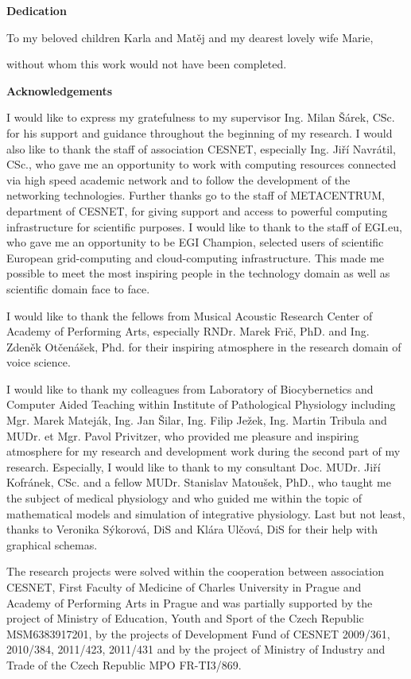 
\newpage
{}

\begin{center}
\Large \textbf{Dedication}
\end{center} 
\vfill
\begin{center}
To my beloved children Karla and Matěj and my dearest lovely wife Marie,

without whom this work would not have been completed.
\end{center} 
\vfill
\newpage
\mbox{}
\newpage
\pagestyle{plain} %
\begin{center}
\Large \textbf{Acknowledgements}
\end{center} 
I would like to express my gratefulness to my supervisor Ing. Milan Šárek, CSc. for his support and guidance throughout the beginning of my research. 
I would also like to thank the staff of association CESNET, especially Ing. Jiří Navrátil, CSc., who gave me an opportunity to work with computing resources connected via high speed academic network and to follow the development of the networking technologies. Further thanks go to the staff of METACENTRUM, department of CESNET, for giving support and access to powerful computing infrastructure for scientific purposes. I would like to thank to the staff of EGI.eu, who gave me an opportunity to be EGI Champion, selected users of scientific European grid-computing and cloud-computing infrastructure. This made me possible to meet the most inspiring people in the technology domain as well as scientific domain face to face. 

I would like to thank the fellows from Musical Acoustic Research Center of Academy of Performing Arts, especially RNDr. Marek Frič, PhD. and Ing. Zdeněk Otčenášek, Phd. for their inspiring atmosphere in the research domain of voice science. 

I would like to thank my colleagues from Laboratory of Biocybernetics and Computer Aided Teaching within Institute of Pathological Physiology including Mgr. Marek Mateják, Ing. Jan Šilar, Ing. Filip Ježek, Ing. Martin Tribula and MUDr. et Mgr. Pavol Privitzer, who provided me pleasure and inspiring atmosphere for my research and development work during the second part of my research. Especially, I would like to thank to my consultant Doc. MUDr. Jiří Kofránek, CSc. and a fellow MUDr. Stanislav Matoušek, PhD., who taught me the subject of medical physiology and who guided me within the topic of mathematical models and simulation of integrative physiology. Last but not least, thanks to Veronika Sýkorová, DiS and Klára Ulčová, DiS for their help with graphical schemas. 

The research projects were solved within the cooperation between association CESNET, First Faculty of Medicine of Charles University in Prague and Academy of Performing Arts in Prague and was partially supported by the project of Ministry of Education, Youth and Sport of the Czech Republic MSM6383917201, by the projects of Development Fund of CESNET 2009/361, 2010/384, 2011/423, 2011/431 and by the project of Ministry of Industry and Trade of the Czech Republic MPO FR-TI3/869.

\newpage
\mbox{}
